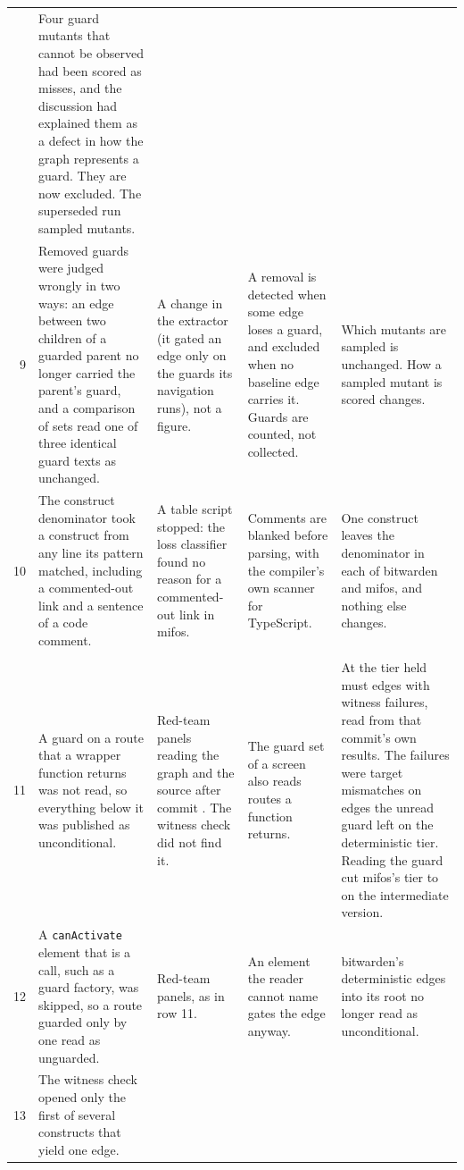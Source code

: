 \begin{xltabular}{\textwidth}{@{}rYYYY@{}}
  & Four guard mutants that cannot be observed had been scored as misses, and the discussion had explained them as a defect in how the graph represents a guard. They are now excluded. The superseded run sampled \MutEarlierSampled{} mutants. \\
9 & Removed guards were judged wrongly in two ways: an edge between two children of a guarded parent no longer carried the parent's guard, and a comparison of sets read one of three identical guard texts as unchanged.
  & A change in the extractor (it gated an edge only on the guards its navigation runs), not a figure.
  & A removal is detected when some edge loses a guard, and excluded when no baseline edge carries it. Guards are counted, not collected.
  & Which mutants are sampled is unchanged. How a sampled mutant is scored changes. \\
10 & The construct denominator took a construct from any line its pattern matched, including a commented-out link and a sentence of a code comment.
  & A table script stopped: the loss classifier found no reason for a commented-out link in mifos.
  & Comments are blanked before parsing, with the compiler's own scanner for TypeScript.
  & One construct leaves the denominator in each of bitwarden and mifos, and nothing else changes. \\
\addlinespace
{} \\
11 & A guard on a route that a wrapper function returns was not read, so everything below it was published as unconditional.
  & Red-team panels reading the graph and the source after commit \EarlierCommit{}. The witness check did not find it.
  & The guard set of a screen also reads routes a function returns.
  & At \EarlierCommit{} the tier held \EarlierMustEdges{} must edges with \EarlierMustViolations{} witness failures, read from that commit's own results. The failures were target mismatches on edges the unread guard left on the deterministic tier. Reading the guard cut mifos's tier to \RoundMustEdgesMifos{} on the intermediate version. \\
12 & A \texttt{canActivate} element that is a call, such as a guard factory, was skipped, so a route guarded only by one read as unguarded.
  & Red-team panels, as in row 11.
  & An element the reader cannot name gates the edge anyway.
  & bitwarden's deterministic edges into its root no longer read as unconditional. \\
13 & The witness check opened only the first of several constructs that yield one edge.

\end{xltabular}
